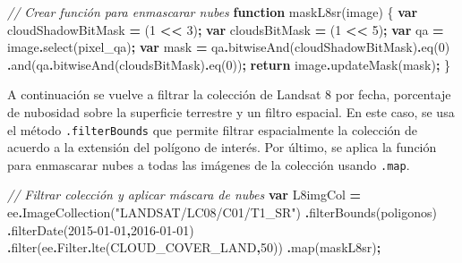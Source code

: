 \documentclass[
  12pt,
  letterpaper,
  twoside]{book}
\newenvironment{Shaded}{\begin{snugshade}}{\end{snugshade}}
\newcommand{\AttributeTok}[1]{\textcolor[rgb]{0.77,0.63,0.00}{#1}}
\newcommand{\CommentTok}[1]{\textcolor[rgb]{0.56,0.35,0.01}{\textit{#1}}}
\newcommand{\ControlFlowTok}[1]{\textcolor[rgb]{0.13,0.29,0.53}{\textbf{#1}}}
\newcommand{\DecValTok}[1]{\textcolor[rgb]{0.00,0.00,0.81}{#1}}
\newcommand{\FunctionTok}[1]{\textcolor[rgb]{0.00,0.00,0.00}{#1}}
\newcommand{\KeywordTok}[1]{\textcolor[rgb]{0.13,0.29,0.53}{\textbf{#1}}}
\newcommand{\NormalTok}[1]{#1}
\newcommand{\OperatorTok}[1]{\textcolor[rgb]{0.81,0.36,0.00}{\textbf{#1}}}
\newcommand{\StringTok}[1]{\textcolor[rgb]{0.31,0.60,0.02}{#1}}
\begin{document}
\begin{Shaded}
\begin{Highlighting}[]
\CommentTok{// Crear función para enmascarar nubes}
\KeywordTok{function} \FunctionTok{maskL8sr}\NormalTok{(image) \{}
  \KeywordTok{var}\NormalTok{ cloudShadowBitMask }\OperatorTok{=}\NormalTok{ (}\DecValTok{1} \OperatorTok{\textless{}\textless{}} \DecValTok{3}\NormalTok{)}\OperatorTok{;}
  \KeywordTok{var}\NormalTok{ cloudsBitMask }\OperatorTok{=}\NormalTok{ (}\DecValTok{1} \OperatorTok{\textless{}\textless{}} \DecValTok{5}\NormalTok{)}\OperatorTok{;}
  \KeywordTok{var}\NormalTok{ qa }\OperatorTok{=}\NormalTok{ image}\OperatorTok{.}\FunctionTok{select}\NormalTok{(}\StringTok{\textquotesingle{}pixel\_qa\textquotesingle{}}\NormalTok{)}\OperatorTok{;}
  \KeywordTok{var}\NormalTok{ mask }\OperatorTok{=}\NormalTok{ qa}\OperatorTok{.}\FunctionTok{bitwiseAnd}\NormalTok{(cloudShadowBitMask)}\OperatorTok{.}\FunctionTok{eq}\NormalTok{(}\DecValTok{0}\NormalTok{)}
                 \OperatorTok{.}\FunctionTok{and}\NormalTok{(qa}\OperatorTok{.}\FunctionTok{bitwiseAnd}\NormalTok{(cloudsBitMask)}\OperatorTok{.}\FunctionTok{eq}\NormalTok{(}\DecValTok{0}\NormalTok{))}\OperatorTok{;}
  \ControlFlowTok{return}\NormalTok{ image}\OperatorTok{.}\FunctionTok{updateMask}\NormalTok{(mask)}\OperatorTok{;}
\NormalTok{\}}
\end{Highlighting}
\end{Shaded}

A continuación se vuelve a filtrar la colección de Landsat 8 por fecha, porcentaje de nubosidad sobre la superficie terrestre y un filtro espacial. En este caso, se usa el método \texttt{.filterBounds} que permite filtrar espacialmente la colección de acuerdo a la extensión del polígono de interés. Por último, se aplica la función para enmascarar nubes a todas las imágenes de la colección usando \texttt{.map}.

\begin{Shaded}
\begin{Highlighting}[]
\CommentTok{// Filtrar colección y aplicar máscara de nubes}
\KeywordTok{var}\NormalTok{ L8imgCol }\OperatorTok{=}\NormalTok{ ee}\OperatorTok{.}\FunctionTok{ImageCollection}\NormalTok{(}\StringTok{"LANDSAT/LC08/C01/T1\_SR"}\NormalTok{)}
  \OperatorTok{.}\FunctionTok{filterBounds}\NormalTok{(poligonos)}
  \OperatorTok{.}\FunctionTok{filterDate}\NormalTok{(}\StringTok{\textquotesingle{}2015{-}01{-}01\textquotesingle{}}\OperatorTok{,}\StringTok{\textquotesingle{}2016{-}01{-}01\textquotesingle{}}\NormalTok{)}
  \OperatorTok{.}\FunctionTok{filter}\NormalTok{(ee}\OperatorTok{.}\AttributeTok{Filter}\OperatorTok{.}\FunctionTok{lte}\NormalTok{(}\StringTok{\textquotesingle{}CLOUD\_COVER\_LAND\textquotesingle{}}\OperatorTok{,}\DecValTok{50}\NormalTok{))}
  \OperatorTok{.}\FunctionTok{map}\NormalTok{(maskL8sr)}\OperatorTok{;}
\end{Highlighting}
\end{Shaded}
\end{document}
